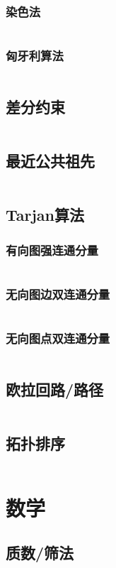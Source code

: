 \documentclass[a4paper,12pt]{article}
\begin{document}
\subsubsection{染色法} 
\inputminted[breaklines]{c++}{graph/2graph/judge.cc}
\subsubsection{匈牙利算法} 
\inputminted[breaklines]{c++}{graph/2graph/xyl.cc}
\subsection{差分约束} %
\inputminted[breaklines]{c++}{graph/cfys/cfys.cc}
\subsection{最近公共祖先} %
\inputminted[breaklines]{c++}{graph/lca/lca.cc}
\subsection{Tarjan算法} %
\subsubsection{有向图强连通分量} 
\inputminted[breaklines]{c++}{graph/tarjan/scc.cc}
\subsubsection{无向图边双连通分量} 
\inputminted[breaklines]{c++}{graph/tarjan/edcc.cc}
\subsubsection{无向图点双连通分量} 
\inputminted[breaklines]{c++}{graph/tarjan/vdcc.cc}
\subsection{欧拉回路/路径} %
\inputminted[breaklines]{c++}{graph/eluer/eluer.cc}
\subsection{拓扑排序} %
\inputminted[breaklines]{c++}{graph/topsort/top.cc}

\newpage
\section{数学}
\subsection{质数/筛法}
\inputminted[breaklines]{c++}{math/prime.cc}
\end{document}
